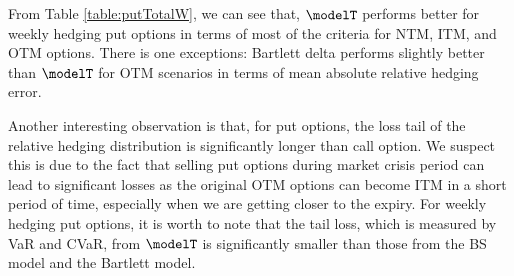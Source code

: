 From Table \ref{table:putTotalW}, we can see that, $\modelT$  performs better for weekly hedging put options in terms of most of the criteria for NTM, ITM, and OTM options.  There  is one  exceptions: Bartlett delta performs  slightly better than $\modelT$ for OTM scenarios in terms of mean absolute relative hedging error. 

Another interesting observation is that, for put options, the loss tail of the relative hedging distribution is significantly longer than call option. We suspect this is due to the fact that selling put options during market crisis period can lead to significant losses as the original OTM options can become ITM in a short period of time, especially when we are getting closer to the expiry. For weekly hedging put options,  it is worth to note that  the tail loss, which is measured by VaR and CVaR, from  $\modelT$ is significantly  smaller than those from the BS model and the Bartlett model. 
